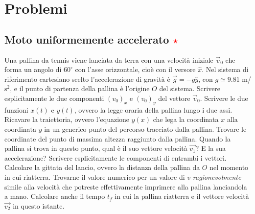 \documentclass[12pt,a4paper]{book}
\newcommand{\rstar}{ \textcolor{red}{$\star$}}
\begin{document}
\newpage

\section{Problemi}
\subsection{Moto uniformemente accelerato \rstar}
Una pallina da tennis viene lanciata da terra con una velocità iniziale $\vec{v}_0$ che forma un angolo di $60^\circ$ con l'asse orizzontale, cioè con il versore $\hat{x}$. Nel sistema di riferimento cartesiano scelto l'accelerazione di gravità è $\vec{g}=-g\hat{y}$, con $g\simeq 9.81 $ m/$\text{s}^2$, e il punto di partenza della pallina è l'origine $O$ del sistema. Scrivere esplicitamente le due componenti $(v_0)_x$ e $(v_0)_y$ del vettore $\vec{v}_0$. Scrivere le due funzioni $x(t)$ e $y(t)$, ovvero la legge oraria della pallina lungo i due assi. Ricavare la traiettoria, ovvero l'equazione $y(x)$ che lega la coordinata $x$ alla 
coordinata $y$ in un generico punto del percorso tracciato dalla pallina. Trovare le coordinate del punto di massima altezza raggiunto dalla pallina. Quando la pallina si trova in questo punto, qual è il suo vettore velocità $\vec{v_1}$? E la sua accelerazione? Scrivere esplicitamente le componenti di entrambi i vettori. Calcolare la gittata del lancio, ovvero la distanza della pallina da $O$ nel momento in cui riatterra. Trovarne il valore numerico per un valore di $v$ \textit{ragionevolmente} simile alla velocità
che potreste effettivamente imprimere alla pallina lanciandola a mano.  Calcolare anche il tempo $t_f$ in cui la pallina riatterra e il vettore velocità $\vec{v_2}$ in questo istante. 
\end{document}
